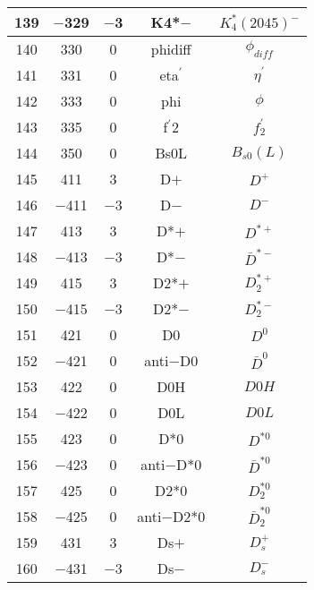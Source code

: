 \documentclass{article}
\begin{document}
\begin{table}[!htbp]
\begin{tabular}{|c|c|c|c|c|}
\hline
139 & $-$329 & $-$3 & K\underline{\hspace{0.6em}}4*$-$ & $K_{4}^{*}(2045)^{-}$ \\
\hline
140 & 330 & 0 & phi\underline{\hspace{0.6em}}diff & $\phi_{diff}$ \\
\hline
141 & 331 & 0 & eta$^{\prime}$ & $\eta^{\prime}$ \\
\hline
142 & 333 & 0 & phi & $\phi$ \\
\hline
143 & 335 & 0 & f$^{\prime}$\underline{\hspace{0.6em}}2 & $f_2^{'}$ \\
\hline
144 & 350 & 0 & B\underline{\hspace{0.6em}}s0L & $B_{s0}(L)$ \\
\hline
145 & 411 & 3 & D$+$ & $D^{+}$ \\
\hline
146 & $-$411 & $-$3 & D$-$ & $D^{-}$ \\
\hline
147 & 413 & 3 & D*$+$ & $D^{*+}$ \\
\hline
148 & $-$413 & $-$3 & D*$-$ & $\bar{D}^{*-}$ \\
\hline
149 & 415 & 3 & D\underline{\hspace{0.6em}}2*$+$ & $D_{2}^{*+}$ \\
\hline
150 & $-$415 & $-$3 & D\underline{\hspace{0.6em}}2*$-$ & $D_{2}^{*-}$ \\
\hline
151 & 421 & 0 & D0 & $D^{0}$ \\
\hline
152 & $-$421 & 0 & anti$-$D0 & $\bar{D}^{0}$ \\
\hline
153 & 422 & 0 & D0H & $D0H$ \\
\hline
154 & $-$422 & 0 & D0L & $D0L$ \\
\hline
155 & 423 & 0 & D*0 & $D^{*0}$ \\
\hline
156 & $-$423 & 0 & anti$-$D*0 & $\bar{D}^{*0}$ \\
\hline
157 & 425 & 0 & D\underline{\hspace{0.6em}}2*0 & $D_{2}^{*0}$ \\
\hline
158 & $-$425 & 0 & anti$-$D\underline{\hspace{0.6em}}2*0 & $\bar{D}_{2}^{*0}$ \\
\hline
159 & 431 & 3 & D\underline{\hspace{0.6em}}s$+$ & $D_{s}^{+}$ \\
\hline
160 & $-$431 & $-$3 & D\underline{\hspace{0.6em}}s$-$ & $D_{s}^{-}$ \\
\hline
\end{tabular}
\end{table}
\end{document}
